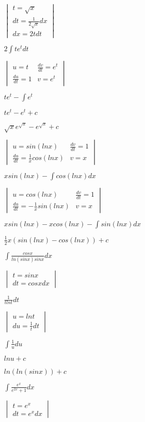 \documentclass{article}
\begin{document}
$
\begin{vmatrix} t = \sqrt{x}\\  dt = \frac{1}{2\sqrt{x}}dx\\ dx = 2tdt \end{vmatrix}
$

$
2\int te^t dt 
$

$
\begin{vmatrix} u = t & \frac{dv}{dt} = e^t\\  \frac{du}{dt} = 1 & v = e^t\end{vmatrix}
$

$
te^t - \int e^t
$

$
te^t - e^t + c
$

$
\sqrt{x}e^{\sqrt{x}} - e^{\sqrt{x}} + c
$

$
\begin{vmatrix} u = sin(lnx) & \frac{dv}{dt} = 1\\  \frac{du}{dt} = \frac{1}{x}cos(lnx) & v = x \end{vmatrix}
$

$
xsin(lnx) - \int cos(lnx)dx
$

$
\begin{vmatrix} u = cos(lnx) & \frac{dv}{dt} = 1\\  \frac{du}{dt} = -\frac{1}{x} sin(lnx) & v = x \end{vmatrix}
$

$
xsin(lnx) - xcos(lnx) - \int sin(lnx)dx
$

$
\frac{1}{2}x(sin(lnx) - cos(lnx)) + c
$

$
\int \frac{cosx}{ln(sinx)sinx}dx 
$

$
\begin{vmatrix} t = sinx \\ dt = cosxdx  \end{vmatrix}
$

$
\frac{1}{tlnt}dt
$

$
\begin{vmatrix} u = lnt \\ du = \frac{1}{t}dt \end{vmatrix}
$

$
\int \frac{1}{u}du
$

$
lnu + c
$

$
ln(ln(sinx)) + c
$

$
\int \frac{e^x}{e^{2x}+1}dx
$

$
\begin{vmatrix} t = e^x \\  dt = e^xdx \end{vmatrix}
$
\end{document}
